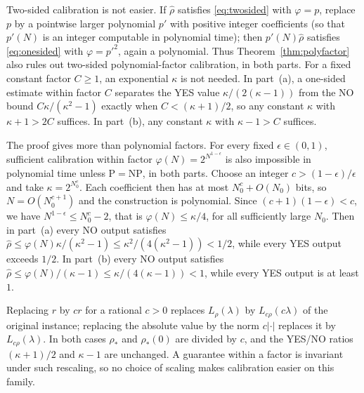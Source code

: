 \begin{remark}\label{rem:twosided}
Two-sided calibration is not easier. If $\widehat\rho$ satisfies
\eqref{eq:twosided} with $\varphi=p$, replace $p$ by a pointwise larger polynomial
$p'$ with positive integer coefficients (so that $p'(N)$ is an integer
computable in polynomial time); then $p'(N)\widehat\rho$ satisfies
\eqref{eq:onesided} with $\varphi=p'^2$, again a polynomial. Thus
Theorem~\ref{thm:polyfactor} also rules out two-sided polynomial-factor
calibration, in both parts. For a fixed constant factor $C\ge1$, an
exponential $\kappa$ is not needed. In part~(a), a one-sided estimate within
factor $C$ separates the YES value $\kappa/(2(\kappa-1))$ from the NO bound
$C\kappa/(\kappa^2-1)$ exactly when $C<(\kappa+1)/2$, so any constant
$\kappa$ with $\kappa+1>2C$ suffices. In part~(b), any constant $\kappa$ with
$\kappa-1>C$ suffices.
\end{remark}

\begin{remark}\label{rem:subexpfactor}
The proof gives more than polynomial factors. For every fixed
$\epsilon\in(0,1)$, sufficient calibration within factor
$\varphi(N)=2^{N^{1-\epsilon}}$ is also impossible in polynomial time unless
$\mathrm P=\mathrm{NP}$, in both parts. Choose an integer
$c>(1-\epsilon)/\epsilon$ and take $\kappa=2^{N_0^c}$. Each coefficient
then has at most $N_0^c+O(N_0)$ bits, so $N=O(N_0^{c+1})$ and the
construction is polynomial. Since $(c+1)(1-\epsilon)<c$, we have
$N^{1-\epsilon}\le N_0^c-2$, that is $\varphi(N)\le\kappa/4$, for all
sufficiently large $N_0$. Then in part~(a) every NO output satisfies
$\widehat\rho\le \varphi(N)\kappa/(\kappa^2-1)\le\kappa^2/(4(\kappa^2-1))<1/2$,
while every YES output exceeds $1/2$. In part~(b) every NO output satisfies
$\widehat\rho\le \varphi(N)/(\kappa-1)\le\kappa/(4(\kappa-1))<1$, while every YES
output is at least $1$.
\end{remark}

\begin{remark}\label{rem:rescaling}
Replacing $r$ by $cr$ for a rational $c>0$ replaces $L_\rho(\lambda)$ by
$L_{c\rho}(c\lambda)$ of the original instance; replacing the absolute value
by the norm $c|\cdot|$ replaces it by $L_{c\rho}(\lambda)$. In both cases $\rho_*$ and $\rho_*(0)$ are divided by $c$, and the
YES/NO ratios $(\kappa+1)/2$ and $\kappa-1$ are unchanged. A guarantee
within a factor is invariant under such rescaling, so no choice of scaling
makes calibration easier on this family.
\end{remark}

